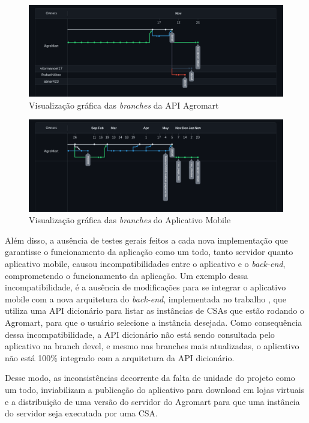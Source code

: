 \begin{figure}[h]
	\centering
	\includegraphics[keepaspectratio=true,scale=0.35]{figuras/agromart_api.png}
	\caption{Visualização gráfica das \textit{branches} da API Agromart}
	\label{agromart_api}
\end{figure}

\begin{figure}[h]
	\centering
	\includegraphics[keepaspectratio=true,scale=0.35]{figuras/agromart_app.png}
	\caption{Visualização gráfica das \textit{branches} do Aplicativo Mobile}
	\label{agromart_app}
\end{figure}

Além disso, a ausência de testes gerais feitos a cada nova implementação que garantisse o funcionamento da aplicação como um todo, tanto servidor quanto aplicativo mobile, causou incompatibilidades entre o aplicativo e o \textit{back-end}, comprometendo o funcionamento da aplicação. Um exemplo dessa incompatibilidade, é a ausência de modificações para se integrar o aplicativo mobile com a nova arquitetura do \textit{back-end}, implementada no trabalho \cite{cellaefreitas2023}, que utiliza uma API dicionário para listar as instâncias de CSAs que estão rodando o Agromart, para que o usuário selecione a instância desejada. Como consequência dessa incompatibilidade, a API dicionário não está sendo consultada pelo aplicativo na branch devel, e mesmo nas branches mais atualizadas, o aplicativo não está 100\% integrado com a arquitetura da API dicionário.

Desse modo, as inconsistências decorrente da falta de unidade do projeto como um todo, inviabilizam a publicação do aplicativo para download em lojas virtuais e a distribuição de uma versão do servidor do Agromart para que uma instância do servidor seja executada por uma CSA.

